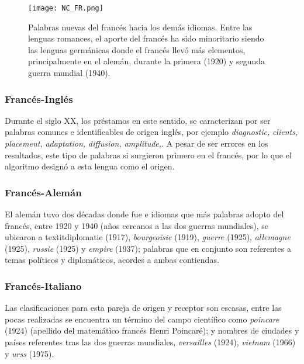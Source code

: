\begin{figure}[h!]
	\centering
	\texttt{[image: NC\_FR.png]}
	\label{fig.NC_FR}
	\caption{Palabras nuevas del francés hacia los demás idiomas. Entre las lenguas romances, el aporte del francés ha sido minoritario siendo las lenguas germánicas donde el francés llevó más elementos, principalmente en el alemán, durante la primera (1920) y segunda guerra mundial (1940).}
	
	
\end{figure}

\subsubsection*{Francés-Inglés}%

Durante el siglo XX, los préstamos en este sentido, se caracterizan por ser palabras comunes e identificables de origen inglés,  por ejemplo  \textit{diagnostic,} \textit{clients,} \textit{placement,} \textit{adaptation,} \textit{diffusion,} \textit{amplitude,}.  A pesar de ser errores en los resultados, este tipo de palabras si surgieron primero en el francés, por lo que el algoritmo designó a esta lengua como el origen. 

\subsubsection*{Francés-Alemán}%

El alemán tuvo dos décadas donde  fue e idiomas que más palabras adopto del francés, entre 1920 y 1940  (años cercanos a las dos guerras mundiales), se ubicaron a  textit{diplomatie} (1917), \textit{bourgeoisie} (1919),  \textit{guerre} (1925), \textit{allemagne} (1925), \textit{russie} (1925) y \textit{empire} (1937); palabras que en conjunto son referentes a temas políticos y diplomáticos, acordes a ambas contiendas. 


\subsubsection*{Francés-Italiano}%

Las clasificaciones para esta pareja de origen y receptor son escasas, entre las pocas realizadas se encuentra un término del campo científico como \textit{poincare} (1924) (apellido del matemático francés Henri Poincaré);  y nombres de ciudades y países referentes tras las dos guerras mundiales, \textit{versailles} (1924), \textit{vietnam} (1966)  y \textit{urss} (1975).


